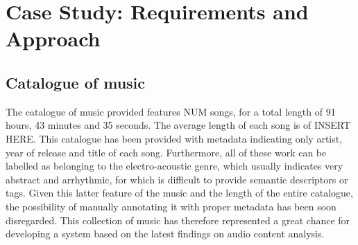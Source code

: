 \chapter{Case Study: Requirements and Approach} %

\label{Chapter4} %


\section{Catalogue of music}
\label{sec:catalogue}
The catalogue of music provided features NUM songs, for a total length of 91 hours, 43 minutes and 35 seconds. The average length of each song is of INSERT HERE. This catalogue has been provided with metadata indicating only artist, year of release and title of each song. Furthermore, all of these work can be labelled as belonging to the electro-acoustic genre, which usually indicates very abstract and arrhythmic, for which is difficult to provide semantic descriptors or tags. Given this latter feature of the music and the length of the entire catalogue, the possibility of manually annotating it with proper metadata has been soon disregarded. This collection of music has therefore represented a great chance for developing a system based on the latest findings on audio content analysis.

